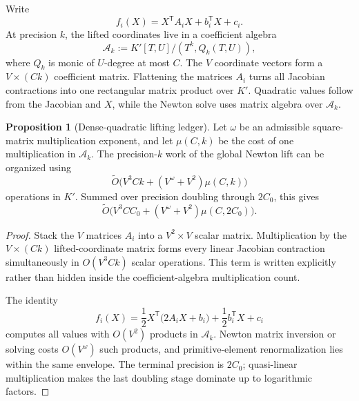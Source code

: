 \documentclass[11pt,a4paper]{article}
\theoremstyle{definition}
\newtheorem{proposition}[theorem]{Proposition}
\theoremstyle{remark}
\newcommand{\softO}{\widetilde O}
\begin{document}
Write
\begin{equation}\label{eq:dense-quad-form}
 f_i(X)=X^{\mathsf T}A_iX+b_i^{\mathsf T}X+c_i.
\end{equation}
At precision $k$, the lifted coordinates live in a coefficient algebra
\begin{equation}\label{eq:coefficient-algebra}
 \mathcal A_k
 :=K'[T,U]/(T^k,Q_k(T,U)),
\end{equation}
where $Q_k$ is monic of $U$-degree at most $C$.  The $V$ coordinate vectors form a $V\times(Ck)$ coefficient matrix.  Flattening the matrices $A_i$ turns all Jacobian contractions into one rectangular matrix product over $K'$.  Quadratic values follow from the Jacobian and $X$, while the Newton solve uses matrix algebra over $\mathcal A_k$.

\begin{proposition}[Dense-quadratic lifting ledger]\label{prop:dense-batched-ledger}
Let $\omega$ be an admissible square-matrix multiplication exponent, and let $\mu(C,k)$ be the cost of one multiplication in $\mathcal A_k$.  The precision-$k$ work of the global Newton lift can be organized using
\begin{equation}\label{eq:precision-k-ledger}
 \softO\bigl(V^3Ck+(V^\omega+V^2)\mu(C,k)\bigr)
\end{equation}
operations in $K'$.  Summed over precision doubling through $2C_0$, this gives
\begin{equation}\label{eq:batched-general}
 \softO\bigl(V^3CC_0+(V^\omega+V^2)\mu(C,2C_0)\bigr).
\end{equation}
\end{proposition}

\begin{proof}
Stack the $V$ matrices $A_i$ into a $V^2\times V$ scalar matrix.  Multiplication by the $V\times(Ck)$ lifted-coordinate matrix forms every linear Jacobian contraction simultaneously in $O(V^3Ck)$ scalar operations.  This term is written explicitly rather than hidden inside the coefficient-algebra multiplication count.

The identity
\[
 f_i(X)=\frac12X^{\mathsf T}\bigl(2A_iX+b_i\bigr)
       +\frac12b_i^{\mathsf T}X+c_i
\]
computes all values with $O(V^2)$ products in $\mathcal A_k$.  Newton matrix inversion or solving costs $O(V^\omega)$ such products, and primitive-element renormalization lies within the same envelope.  The terminal precision is $2C_0$; quasi-linear multiplication makes the last doubling stage dominate up to logarithmic factors.
\end{proof}
\end{document}
